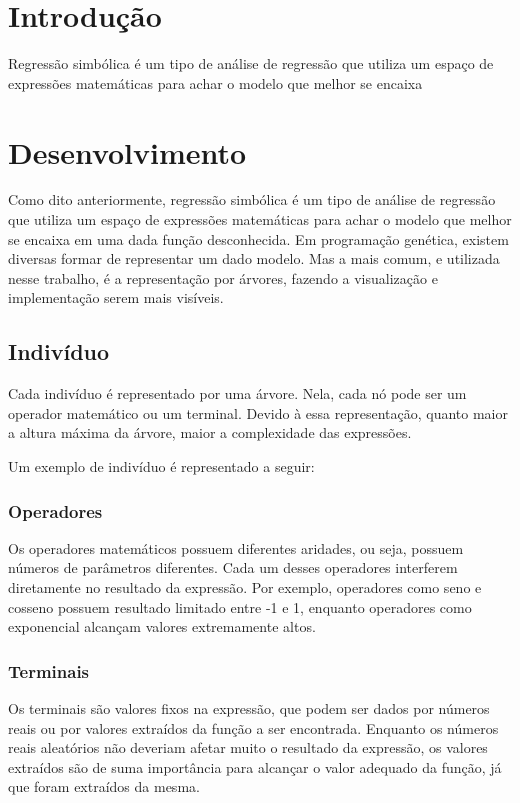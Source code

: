 \documentclass[]{article}
\title{}
\author{}
\begin{document}
\maketitle

\begin{abstract}

\end{abstract}

\section{Introdução}

Regressão simbólica é um tipo de análise de regressão que utiliza um espaço de expressões matemáticas para achar o modelo que melhor se encaixa  
 
\section{Desenvolvimento}
Como dito anteriormente, regressão simbólica é um tipo de análise de regressão que utiliza um espaço de expressões matemáticas para achar o modelo que melhor se encaixa em uma dada função desconhecida. Em programação genética, existem diversas formar de representar um dado modelo. Mas a mais comum, e utilizada nesse trabalho, é a representação por árvores, fazendo a visualização e implementação serem mais visíveis.

\subsection{Indivíduo}
Cada indivíduo é representado por uma árvore. Nela, cada nó pode ser um operador matemático ou um terminal. Devido à essa representação, quanto maior a altura máxima da árvore, maior a complexidade das expressões.

Um exemplo de indivíduo é representado a seguir: 

\subsubsection{Operadores}
Os operadores matemáticos possuem diferentes aridades, ou seja, possuem números de parâmetros diferentes.  Cada um desses operadores interferem diretamente no resultado da expressão. Por exemplo, operadores como seno e cosseno possuem resultado limitado entre -1 e 1, enquanto operadores como exponencial alcançam valores extremamente altos.

\subsubsection{Terminais}
Os terminais são valores fixos na expressão, que podem ser dados por números reais ou por valores extraídos da função a ser encontrada. Enquanto os números reais aleatórios não deveriam afetar muito o resultado da expressão, os valores extraídos são de suma importância para alcançar o valor adequado da função, já que foram extraídos da mesma.
\end{document}
